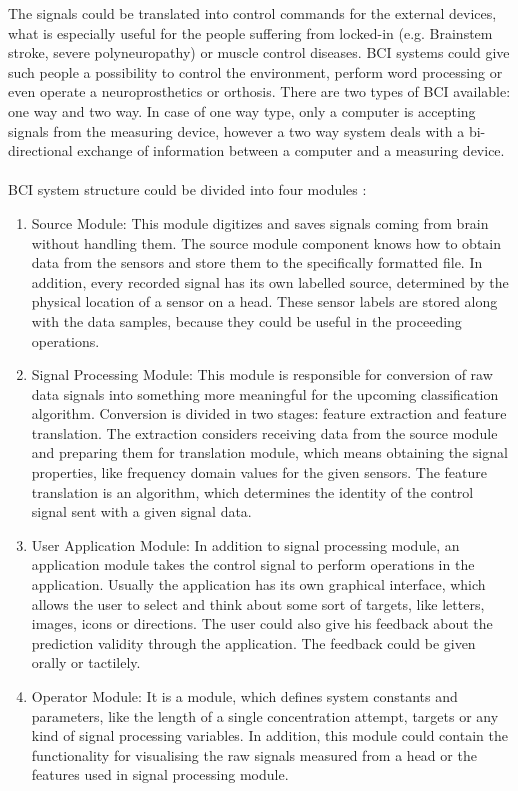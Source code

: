 \documentclass[12pt]{article}
\theoremstyle{definition}
\begin{document}
The signals could be translated into control commands for the external devices, what is especially useful for the people suffering from locked-in (e.g. Brainstem stroke, severe polyneuropathy) or muscle control diseases.  BCI systems could give such people a possibility to control the environment, perform word processing or even operate a neuroprosthetics or orthosis.
There are two types of BCI available: one way and two way. In case of one way type, only a computer is accepting signals from the measuring device, however a two way system deals with a bi-directional exchange of information between a computer and a measuring device. \cite{bci_shivangi}
\paragraph{}
BCI system structure could be divided into four modules \cite{bci_shivangi}:
\begin{enumerate}
\item Source Module:
This module digitizes and saves signals coming from brain without handling them. The source module component knows how to obtain data from the sensors and store them to the specifically formatted file. In addition, every recorded signal has its own labelled source, determined by the physical location of a sensor on a head. These sensor labels are stored along with the data samples, because they could be useful in the proceeding operations. 
\item Signal Processing Module:
This module is responsible for conversion of raw data signals into something more meaningful for the upcoming classification algorithm. Conversion is divided in two stages: feature extraction and feature translation. The extraction considers receiving data from the source module and preparing them for translation module, which means obtaining the signal properties, like frequency domain values for the given sensors. The feature translation is an algorithm, which determines the identity of the control signal sent with a given signal data.
\item User Application Module:
In addition to signal processing module, an application module takes the control signal to perform operations in the application. Usually the application has its own graphical interface, which allows the user to select and think about some sort of targets, like letters, images, icons or directions. The user could also give his feedback about the prediction validity through the application. The feedback could be given orally or tactilely. 
\item Operator Module:
It is a module, which defines system constants and parameters, like the length of a single concentration attempt, targets or any kind of signal processing variables. In addition, this module could contain the functionality for visualising the raw signals measured from a head or the features used in signal processing module.
\end{enumerate}
\end{document}
